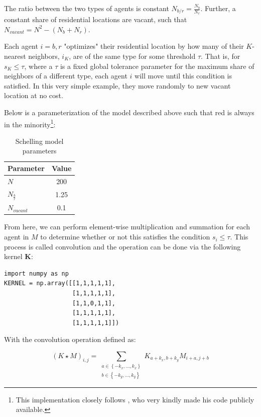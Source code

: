 \documentclass[../main.tex]{subfiles}
\begin{document}
The ratio between the two types of agents is constant $N_{b/r} = \frac{N_b}{N_r}$. Further, a constant share of residential locations are vacant, such that $N_{vacant} = N^2 - (N_b + N_r)$. 

Each agent $i = b, r$ "optimizes" their residential location by how many of their $K$-nearest neighbors, $i_K$, are of the same type for some threshold $\tau$. That is, for $s_K \leq \tau$, where a $\tau$ is a fixed global tolerance parameter for the maximum share of neighbors of a different type, each agent $i$ will move until this condition is satisfied. In this very simple example, they move randomly to new vacant location at no cost. 

Below is a parameterization of the model described above such that red is always in the minority\footnote{This implementation closely follows \textcite{luca_mingarelli}, who very kindly made his code publicly available.}:

\begin{table}[H]
    \centering
    \caption{Schelling model parameters}
    \begin{tabular}{lc}
    \toprule
      Parameter & Value \\
    \midrule
      $N$         & 200 \\
      $N_{\frac{b}{r}}$       & 1.25 \\
      $N_{vacant}$ & 0.1 \\
    \bottomrule
    \end{tabular}
\end{table}

From here, we can perform element-wise multiplication and summation for each agent in $M$ to determine whether or not this satisfies the condition $s_i \leq \tau$. This process is called convolution and the operation can be done via the following kernel $\mathbf{K}$:

\newpage
\begin{lstlisting}[style=pythonstyle]
import numpy as np
KERNEL = np.array([[1,1,1,1,1],
                   [1,1,1,1,1],
                   [1,1,0,1,1],
                   [1,1,1,1,1],
                   [1,1,1,1,1]])

\end{lstlisting}

With the convolution operation defined as:

\begin{equation}
(K \star M)_{i, j}=\sum_{\substack{a \in\left\{-k_x, \ldots, k_x\right\} \\ b \in\left\{-k_y, \ldots, k_y\right\}}} K_{a+k_x, b+k_y} M_{i+a, j+b}
\label{eq:convolution}
\end{equation}
\end{document}
